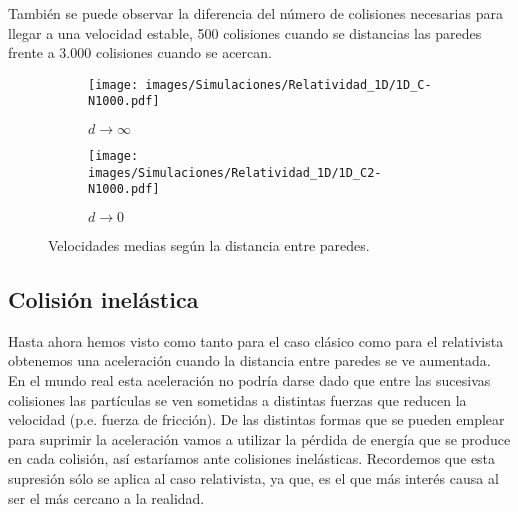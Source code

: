 \vspace{3mm}

 También se puede observar la diferencia del número de colisiones necesarias para llegar a una velocidad estable, 500 colisiones cuando se distancias las paredes frente a 3.000 colisiones cuando se acercan.

\begin{figure}[!h]
    \begin{subfigure}[b]{0.5\textwidth}
        \centering
        \texttt{[image: images/Simulaciones/Relatividad\_1D/1D\_C-N1000.pdf]}
        \caption{$d \rightarrow \infty$}
        \label{fig:relatividad_1D_C}
    \end{subfigure}
    \hfill
    \begin{subfigure}[b]{0.5\textwidth}
        \centering
        \texttt{[image: images/Simulaciones/Relatividad\_1D/1D\_C2-N1000.pdf]}
        \caption{$d \rightarrow 0$}
        \label{fig:relatividad_1D_C2}
    \end{subfigure}
    \caption{Velocidades medias según la distancia entre paredes.}
\end{figure}

\subsection{Colisión inelástica}

Hasta ahora hemos visto como tanto para el caso clásico como para el relativista obtenemos una aceleración cuando la distancia entre paredes se ve aumentada. En el mundo real esta aceleración no podría darse dado que entre las sucesivas colisiones las partículas se ven sometidas a distintas fuerzas que reducen la velocidad (p.e. fuerza de fricción). De las distintas formas que se pueden emplear para suprimir la aceleración vamos a utilizar la pérdida de energía que se produce en cada colisión, así estaríamos ante colisiones inelásticas. Recordemos que esta supresión sólo se aplica al caso relativista, ya que, es el que más interés causa al ser el más cercano a la realidad.




